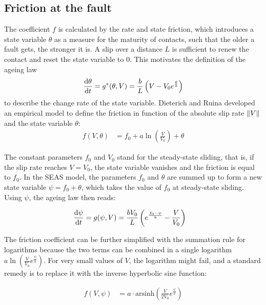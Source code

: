\subsection{Friction at the fault}
\label{ssec:FrictionLaws}
The coefficient $f$ is calculated by the rate and state friction, which introduces a state variable $\theta$ as a measure for the maturity of contacts, such that the older a fault gets, the stronger it is. A slip over a distance $L$ is sufficient to renew the contact and reset the state variable to 0. This motivates the definition of the ageing law
\begin{equation}
	\dv{\theta}{t} = g^*(\theta, V) = \frac{b}{L}\left(V - V_0e^{\frac{\theta}{b}}\right)
\end{equation} 
to describe the change rate of the state variable. Dieterich \cite{Dieterich79,Dieterich81} and Ruina \cite{Ruina} developed an empirical model to define the friction in function of the absolute slip rate $\norm{V}$ and the state variable $\theta$:
\begin{align}
	\label{eq:GeneralFrictionCoefficient}
	f(V,\theta) &= f_0 + a\ln(\frac{V}{V_0}) + \theta
\end{align}

The constant parameters $f_0$ and $V_0$ stand for the steady-state sliding, that is, if the slip rate reaches $V=V_0$, the state variable vanishes and the friction is equal to $f_0$. In the SEAS model, the parameters $f_0$ and $\theta$ are summed up to form a new state variable $\psi = f_0 +\theta$, which takes the value of $f_0$ at steady-state sliding. Using $\psi$, the ageing law then reads: 

\begin{align}
	\label{eq:GeneralAgeingLaw}
	\dv{\psi}{t} = g(\psi, V) &= \frac{bV_0}{L}\left(e^{\frac{f_0 - \psi}{b}} - \frac{V}{V_0}\right)
\end{align}

The friction coefficient can be further simplified with the summation rule for logarithms because the two terms can be combined in a single logarithm $a\ln(\frac{V}{V_0}e^{\frac{\psi}{a}})$. For very small values of $V$, the logarithm might fail, and a standard remedy \cite{Lapusta} is to replace it with the inverse hyperbolic sine function:

\begin{align}
\label{eq:SEASFrictionCoefficient}
	f(V, \psi) &= a\cdot \text{arsinh}\left(\frac{V}{2V_0}e^{\frac{\psi}{a}}\right)
\end{align}

